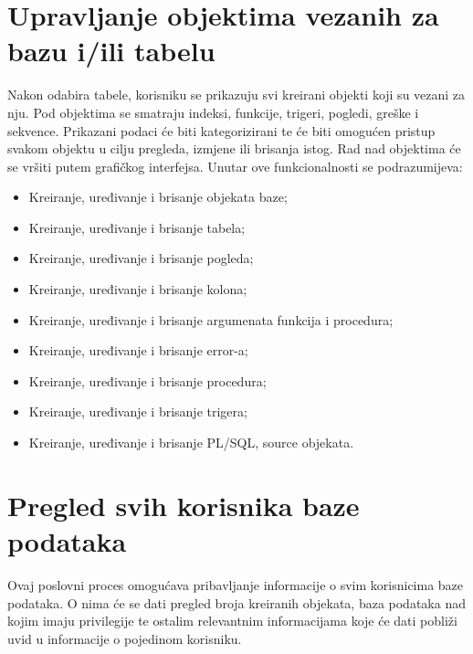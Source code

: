 \documentclass[12pt, a4paper]{report}
\theoremstyle{definition}
\begin{document}
\section{Upravljanje objektima vezanih za bazu i/ili tabelu}
Nakon odabira tabele, korisniku se prikazuju svi kreirani objekti koji su vezani za nju. Pod objektima se smatraju indeksi, funkcije, trigeri, pogledi, greške i sekvence. Prikazani podaci će biti kategorizirani te će biti omogućen pristup  svakom objektu u cilju pregleda, izmjene ili brisanja istog. Rad nad objektima će se vršiti putem grafičkog interfejsa. Unutar ove funkcionalnosti se podrazumijeva:
	\begin{itemize}
		\item Kreiranje, uređivanje i brisanje objekata baze;		
		\item Kreiranje, uređivanje i brisanje tabela;
		
		\item Kreiranje, uređivanje i brisanje pogleda;
		
		\item Kreiranje, uređivanje i brisanje kolona;
		
		\item Kreiranje, uređivanje i brisanje argumenata funkcija i procedura;
		
		\item Kreiranje, uređivanje i brisanje error-a;
		
		\item Kreiranje, uređivanje i brisanje procedura;
		
		\item Kreiranje, uređivanje i brisanje trigera;
		
		\item Kreiranje, uređivanje i brisanje PL/SQL, source objekata.
	\end{itemize}

\section{Pregled svih korisnika baze podataka}
Ovaj poslovni proces omogućava pribavljanje informacije o svim korisnicima baze podataka. O nima će se dati pregled broja kreiranih objekata, baza podataka nad kojim imaju privilegije te ostalim relevantnim informacijama koje će dati pobliži uvid u informacije o pojedinom korisniku.
\newpage
\end{document}

